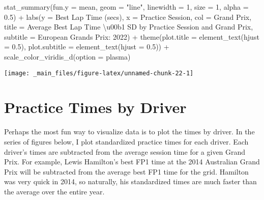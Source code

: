 \documentclass[
]{book}
\newenvironment{Shaded}{\begin{snugshade}}{\end{snugshade}}
\newcommand{\AttributeTok}[1]{\textcolor[rgb]{0.77,0.63,0.00}{#1}}
\newcommand{\DecValTok}[1]{\textcolor[rgb]{0.00,0.00,0.81}{#1}}
\newcommand{\FloatTok}[1]{\textcolor[rgb]{0.00,0.00,0.81}{#1}}
\newcommand{\FunctionTok}[1]{\textcolor[rgb]{0.00,0.00,0.00}{#1}}
\newcommand{\NormalTok}[1]{#1}
\newcommand{\SpecialCharTok}[1]{\textcolor[rgb]{0.00,0.00,0.00}{#1}}
\newcommand{\StringTok}[1]{\textcolor[rgb]{0.31,0.60,0.02}{#1}}
\begin{document}
\begin{Shaded}
\begin{Highlighting}[]
  \FunctionTok{stat\_summary}\NormalTok{(}\AttributeTok{fun.y =}\NormalTok{ mean,}
               \AttributeTok{geom =} \StringTok{"line"}\NormalTok{, }
               \AttributeTok{linewidth =} \DecValTok{1}\NormalTok{, }\AttributeTok{size =} \DecValTok{1}\NormalTok{, }\AttributeTok{alpha =} \FloatTok{0.5}\NormalTok{) }\SpecialCharTok{+}
  \FunctionTok{labs}\NormalTok{(}\AttributeTok{y =} \StringTok{\textquotesingle{}Best Lap Time (secs)\textquotesingle{}}\NormalTok{,}
       \AttributeTok{x =} \StringTok{\textquotesingle{}Practice Session\textquotesingle{}}\NormalTok{,}
       \AttributeTok{col =} \StringTok{\textquotesingle{}Grand Prix\textquotesingle{}}\NormalTok{,}
       \AttributeTok{title =} \StringTok{\textquotesingle{}Average Best Lap Time \textbackslash{}u00b1 SD by Practice Session and Grand Prix\textquotesingle{}}\NormalTok{,}
       \AttributeTok{subtitle =} \StringTok{\textquotesingle{}European Grands Prix: 2022\textquotesingle{}}\NormalTok{) }\SpecialCharTok{+}
  \FunctionTok{theme}\NormalTok{(}\AttributeTok{plot.title =} \FunctionTok{element\_text}\NormalTok{(}\AttributeTok{hjust =} \FloatTok{0.5}\NormalTok{),}
        \AttributeTok{plot.subtitle =} \FunctionTok{element\_text}\NormalTok{(}\AttributeTok{hjust =} \FloatTok{0.5}\NormalTok{)) }\SpecialCharTok{+}
  \FunctionTok{scale\_color\_viridis\_d}\NormalTok{(}\AttributeTok{option =} \StringTok{\textquotesingle{}plasma\textquotesingle{}}\NormalTok{)}
\end{Highlighting}
\end{Shaded}

\begin{center}\texttt{[image: \_main\_files/figure-latex/unnamed-chunk-22-1]} \end{center}

\hypertarget{practice-times-by-driver}{%
\section{Practice Times by Driver}\label{practice-times-by-driver}}

Perhaps the most fun way to visualize data is to plot the times by driver. In the series of figures below, I plot standardized practice times for each driver. Each driver's times are subtracted from the average session time for a given Grand Prix. For example, Lewis Hamilton's best FP1 time at the 2014 Australian Grand Prix will be subtracted from the average best FP1 time for the grid. Hamilton was very quick in 2014, so naturally, his standardized times are much faster than the average over the entire year.
\end{document}
